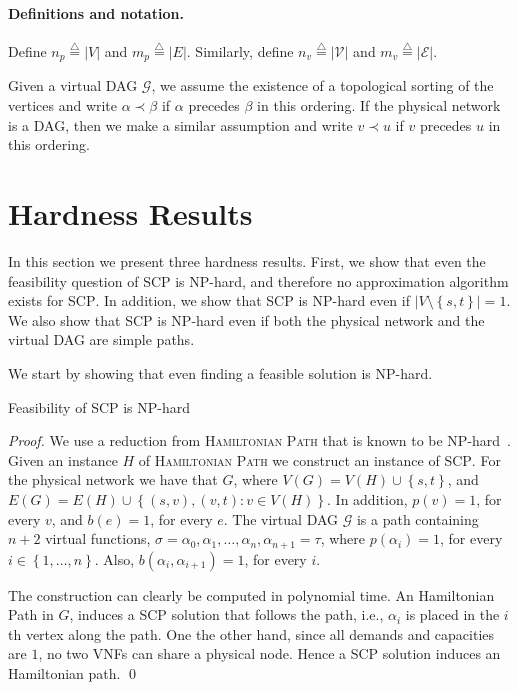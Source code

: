 \documentclass[runningheads]{llncs}
\newcommand{\eqdf}{\stackrel{\scriptscriptstyle \triangle}{=}}
\newcommand{\set}[1]{\left\{ #1 \right\}}
\newcommand{\abs}[1]{\left| #1 \right|}
\newcommand{\scp}{\textsc{SCP}\xspace}
\newcommand{\calE}{\mathcal{E}}
\newcommand{\calG}{\mathcal{G}}
\newcommand{\calV}{\mathcal{V}}
\begin{document}

\paragraph*{\bf Definitions and notation.}
%
Define $n_p \eqdf \abs{V}$ and $m_p \eqdf \abs{E}$.  Similarly, define
$n_v \eqdf \abs{\calV}$ and $m_v \eqdf \abs{\calE}$.

Given a virtual DAG $\calG$, we assume the existence of a topological
sorting of the vertices and write $\alpha \prec \beta$ if $\alpha$
precedes $\beta$ in this ordering.  If the physical network is a DAG,
then we make a similar assumption and write $v \prec u$ if $v$
precedes $u$ in this ordering.



\section{Hardness Results}

In this section we present three hardness results.  First, we show
that even the feasibility question of \scp is NP-hard, and therefore
no approximation algorithm exists for \scp.  In addition, we show that
\scp is NP-hard even if $\abs{V \setminus \set{s,t}} = 1$.  We also
show that \scp is NP-hard even if both the physical network and the
virtual DAG are simple paths.

We start by showing that even finding a feasible solution is NP-hard.

\begin{theorem}
Feasibility of \scp is NP-hard
\end{theorem}
\begin{proof}
We use a reduction from \textsc{Hamiltonian Path} that is known to be
NP-hard~\cite{GarJoh79}.
%
Given an instance $H$ of \textsc{Hamiltonian Path} we construct an
instance of \scp.  For the physical network we have that $G$, where
$V(G) = V(H) \cup \set{s,t}$, and $E(G) = E(H) \cup \set{(s,v),(v,t) :
  v \in V(H)}$.  In addition, $p(v) = 1$, for every $v$, and $b(e) =
1$, for every $e$.  The virtual DAG $\calG$ is a path containing $n+2$
virtual functions, $\sigma = \alpha_0, \alpha_1, \ldots, \alpha_n,
\alpha_{n+1} = \tau$, where $p(\alpha_i) = 1$, for every $i \in
\set{1,\ldots,n}$.  Also, $b(\alpha_i,\alpha_{i+1}) = 1$, for every
$i$.

The construction can clearly be computed in polynomial time.
%
An Hamiltonian Path in $G$, induces a \scp solution that follows the
path, i.e., $\alpha_i$ is placed in the $i$th vertex along the path.
%
One the other hand, since all demands and capacities are $1$, no two
VNFs can share a physical node.  Hence a \scp solution induces an
Hamiltonian path.
%
\qed
\end{proof}
\end{document}

